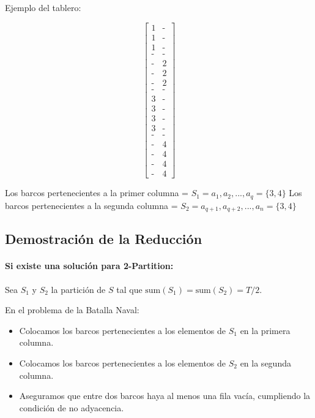 \vskip0.25cm

Ejemplo del tablero: 

\begin{center}
\[
    \begin{bmatrix}
    1 & \text{-} \\
    1 & \text{-} \\
    1 & \text{-} \\
    \text{-} & \text{-} \\
    \text{-} & 2 \\
    \text{-} & 2 \\
    \text{-} & 2 \\
    \text{-} & \text{-} \\
    3 & \text{-} \\
    3 & \text{-} \\
    3 & \text{-} \\
    3 & \text{-} \\
    \text{-} & \text{-} \\
    \text{-} & 4 \\
    \text{-} & 4 \\
    \text{-} & 4 \\
    \text{-} & 4
    \end{bmatrix}
\]
\end{center}

Los barcos pertenecientes a la primer columna = $S_{1} = {a_{1}, a_{2},...,a_{q}} = \{3, 4\}$ 
\vskip0.25cm
Los barcos pertenecientes a la segunda columna = $S_{2} = {a_{q +1}, a_{q + 2},..., a_{n}} = \{3, 4\}$
\vskip0.5cm
\subsection*{Demostración de la Reducción}

\paragraph{ Si existe una solución para 2-Partition:}
  
Sea $S_1$ y $S_2$ la partición de $S$ tal que $\text{sum}(S_1) = \text{sum}(S_2) = T / 2$.  

En el problema de la Batalla Naval:

\begin{itemize}
    \item Colocamos los barcos pertenecientes a los elementos de $S_1$ en la primera columna.
    \item Colocamos los barcos pertenecientes a los elementos de $S_2$ en la segunda columna.
    \item Aseguramos que entre dos barcos haya al menos una fila vacía, cumpliendo la condición de no adyacencia.
\end{itemize}

